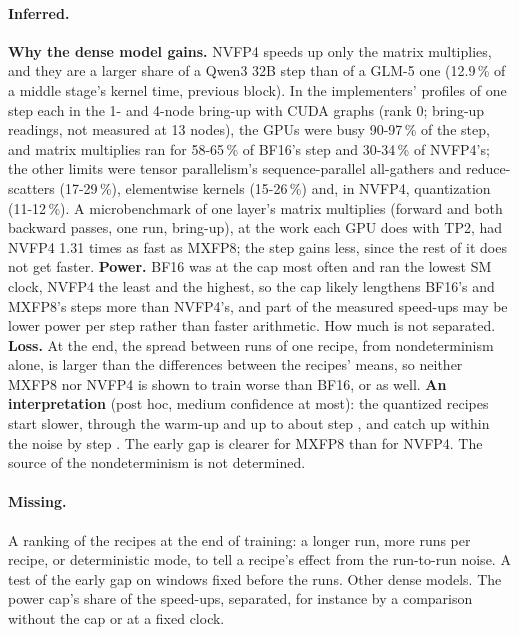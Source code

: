 \paragraph{Inferred.} \textbf{Why the dense model gains.} NVFP4 speeds up only the matrix multiplies, and they are a larger share of a Qwen3 32B step than of a GLM-5 one (12.9\,\% of a middle stage's kernel time, previous block). In the implementers' profiles of one step each in the 1- and 4-node bring-up with CUDA graphs (rank 0; bring-up readings, not measured at 13 nodes), the GPUs were busy 90-97\,\% of the step, and matrix multiplies ran for 58-65\,\% of BF16's step and 30-34\,\% of NVFP4's; the other limits were tensor parallelism's sequence-parallel all-gathers and reduce-scatters (17-29\,\%), elementwise kernels (15-26\,\%) and, in NVFP4, quantization (11-12\,\%). A microbenchmark of one layer's matrix multiplies (forward and both backward passes, one run, bring-up), at the work each GPU does with TP2, had NVFP4 1.31 times as fast as MXFP8; the step gains less, since the rest of it does not get faster. \textbf{Power.} BF16 was at the cap most often and ran the lowest SM clock, NVFP4 the least and the highest, so the cap likely lengthens BF16's and MXFP8's steps more than NVFP4's, and part of the measured speed-ups may be lower power per step rather than faster arithmetic. How much is not separated. \textbf{Loss.} At the end, the spread between runs of one recipe, from nondeterminism alone, is larger than the differences between the recipes' means, so neither MXFP8 nor NVFP4 is shown to train worse than BF16, or as well. \textbf{An interpretation} (post hoc, medium confidence at most): the quantized recipes start slower, through the warm-up and up to about step \TriQwFpFourCut, and catch up within the noise by step \TriQwFpFourLSteps. The early gap is clearer for MXFP8 than for NVFP4. The source of the nondeterminism is not determined.

\paragraph{Missing.} A ranking of the recipes at the end of training: a longer run, more runs per recipe, or deterministic mode, to tell a recipe's effect from the run-to-run noise. A test of the early gap on windows fixed before the runs. Other dense models. The power cap's share of the speed-ups, separated, for instance by a comparison without the cap or at a fixed clock.

